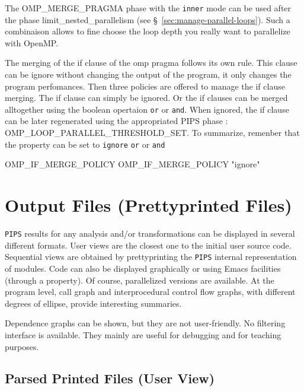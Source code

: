 \documentclass[a4paper]{report}
\newcommand{\Pips}{\texttt{PIPS}}
\begin{document}
The OMP\_MERGE\_PRAGMA phase with the \verb|inner| mode can be used after the
phase limit\_nested\_parallelism (see \S~\ref{sec:manage-parallel-loops}).
Such a combinaison allows to fine choose the loop depth you
really want to parallelize with OpenMP.

The merging of the if clause of the omp pragma follows its own rule.
This clause can be ignore without changing the output of the program,
it only changes the program perfomances.
Then three policies are offered to manage the if clause merging. The if clause
can simply be ignored. Or the if clauses can be merged alltogether using the
boolean opertaion \verb|or| or \verb|and|. When ignored, the if clause can be
later regenerated using the appropriated PIPS phase :
OMP\_LOOP\_PARALLEL\_THRESHOLD\_SET. To summarize, remenber that the property
can be set to \verb|ignore| \verb|or| or \verb|and|
\begin{PipsProp}{OMP_IF_MERGE_POLICY}
OMP_IF_MERGE_POLICY "ignore"
\end{PipsProp}


\chapter{Output Files (Prettyprinted Files)}
\label{section-output-files}

\Pips{} results for any analysis and/or transformations can be
displayed in several different formats. User views are the closest one
to the initial user source code. Sequential views are obtained by
prettyprinting the \Pips{} internal representation of modules. Code
can also be displayed graphically or using Emacs facilities (through a
property). Of course, parallelized versions are available. At the
program level, call graph and interprocedural control flow graphs,
with different degrees of ellipse, provide interesting summaries.

Dependence graphs can be shown, but they are not user-friendly. No
filtering interface is available. They mainly are useful for debugging
and for teaching purposes.

\section{Parsed Printed Files (User View)}
\end{document}
